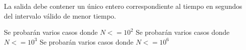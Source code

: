 \documentclass{oci}
\begin{document}
\begin{outputDescription}
  La salida debe contener un único entero correspondiente al tiempo en segundos
  del intervalo válido de menor tiempo.
\end{outputDescription}

\begin{scoreDescription}
   Se probarán varios casos donde $N<=10^2$
   Se probarán varios casos donde $N<=10^3$
   Se probarán varios casos donde $N<=10^6$
\end{scoreDescription}

\begin{sampleDescription}
\end{sampleDescription}
\end{document}
